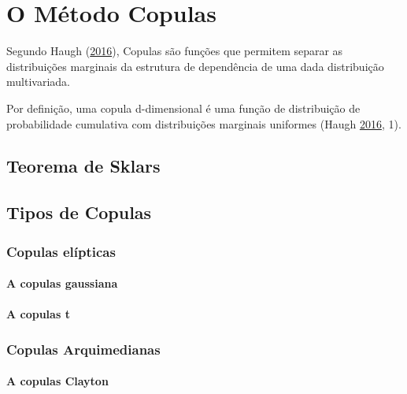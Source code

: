 \documentclass[
	12pt,				%
	oneside,			%
	a4paper,			%
	chapter=TITLE,		%
	section=TITLE,		%
	english,			%
	brazil				%
	]{abntex2}
\begin{document}
\hypertarget{copulas}{%
\chapter{O Método Copulas}\label{copulas}}

Segundo Haugh (\protect\hyperlink{ref-copulas}{2016}), Copulas são funções que permitem separar as distribuições
marginais da estrutura de dependência de uma dada distribuição multivariada.

Por definição, uma copula d-dimensional é uma função de distribuição de
probabilidade cumulativa com distribuições marginais uniformes (Haugh \protect\hyperlink{ref-copulas}{2016}, 1).

\hypertarget{teorema-de-sklars}{%
\section{Teorema de Sklars}\label{teorema-de-sklars}}

\hypertarget{tipos-de-copulas}{%
\section{Tipos de Copulas}\label{tipos-de-copulas}}

\hypertarget{copulas-eluxedpticas}{%
\subsection{Copulas elípticas}\label{copulas-eluxedpticas}}

\hypertarget{a-copulas-gaussiana}{%
\subsubsection{A copulas gaussiana}\label{a-copulas-gaussiana}}

\hypertarget{a-copulas-t}{%
\subsubsection{A copulas t}\label{a-copulas-t}}

\hypertarget{copulas-arquimedianas}{%
\subsection{Copulas Arquimedianas}\label{copulas-arquimedianas}}

\hypertarget{a-copulas-clayton}{%
\subsubsection{A copulas Clayton}\label{a-copulas-clayton}}
\end{document}
